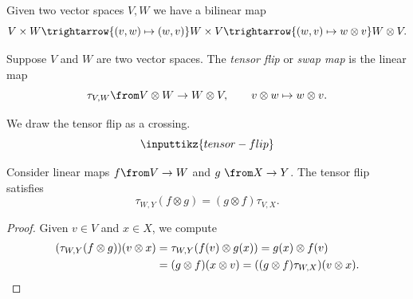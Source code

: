 \documentclass[a4paper,oneside, 12pt]{amsart}
\begin{document}
Given two vector spaces \(V,W\) we have a bilinear map
\begin{equation*}
  V\times W \trightarrow{(v,w)\mapsto (w,v)} W\times V \trightarrow{(w,v)\mapsto w\otimes v} W\otimes V.
\end{equation*}

\begin{definition}\label{def:tensor-flip}
  Suppose \(V\) and \(W\) are two vector spaces.
  The \emph{tensor flip} or \emph{swap map} is the linear map
  \begin{equation}
    \tau_{V,W}\from V\otimes W \to W\otimes V, \qquad v\otimes w \mapsto w\otimes v.
  \end{equation}
\end{definition}


We draw the tensor flip as a crossing.
\begin{equation*}
  \inputtikz{tensor-flip}
\end{equation*}


\begin{lemma}\label{lem:tensor-flip}
  Consider linear maps \(f\from V\to W\) and \(g\ \from X\to Y\).
  The tensor flip satisfies
  \begin{equation}
    \tau_{W,Y}(f\otimes g)= (g\otimes f) \tau_{V,X}.
  \end{equation}
\end{lemma}
\begin{proof}
  Given \(v\in V\) and \(x\in X\), we compute
  \begin{align*}
    (\tau_{W,Y}(f\otimes g))(v\otimes x)
    & = \tau_{W, Y} (f(v) \otimes g(x))
      = g(x) \otimes f(v) \\
    & = (g \otimes f)(x\otimes v)
      = ((g\otimes f) \tau_{W,X})(v\otimes x). \qedhere
  \end{align*}
\end{proof}
\end{document}

